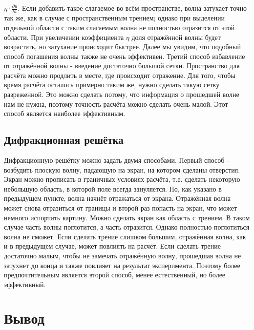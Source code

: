 \documentclass[
11pt,%
tightenlines,%
twoside,%
onecolumn,%
nofloats,%
nobibnotes,%
nofootinbib,%
superscriptaddress,%
noshowpacs,%
centertags]%
{revtex4}
\begin{document}
$\eta \cdot \frac{\partial u}{\partial t}$. Если добавить такое слагаемое во всём пространстве, волна
затухает точно так же, как в случае с пространственным трением; однако при выделении отдельной области
с таким слагаемым волна не полностью отразится от этой области. При увеличении коэффициента $\eta$ 
доля отражённой волны будет возрастать, но затухание происходит быстрее. Далее мы увидим, что 
подобный способ погашения волны также не очень эффективен. \newline
Третий способ избавление от отражённой волны - введение достаточно большой сетки. Пространство для 
расчёта можно продлить в месте, где происходит отражение. Для того, чтобы время 
расчёта осталось примерно таким же, нужно сделать такую сетку разреженной. Это можно сделать потому, 
что информация о прошедшей волне нам не нужна, поэтому точность расчёта можно сделать очень малой. 
Этот способ является наиболее эффективным.

\subsection{Дифракционная решётка}
Дифракционную решётку можно задать двумя способами. Первый способ - возбудить плоскую волну, падающую
на экран, на котором сделаны отверстия. Экран можно прописать в граничных условиях расчёта, т.е. 
сделать некоторую небольшую область, в которой поле всегда зануляется. Но, как указано в предыдущем 
пункте, волна начнёт отражаться от экрана. Отражённая волна может снова отразиться от границы и второй
раз попасть на экран, что может немного испортить картину. Можно сделать экран как область с трением. 
В таком случае часть волны поглотится, а часть отразится. Однако полностью поглотиться волна не сможет.
Если сделать трение слишком большим, отражённая волна, как и в предыдущем случае, может повлиять на 
расчёт. Если сделать трение достаточно малым, чтобы не замечать отражённую волну, прошедшая волна 
не затухнет до конца и также повлияет на результат эксперимента. Поэтому более предпочтительным 
является второй способ, менее естественный, но более эффективный. 




\section{Вывод}
\end{document}
